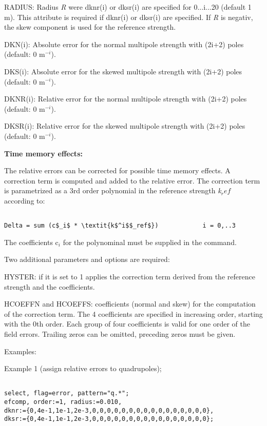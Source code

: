 RADIUS: Radius \textit{R} were dknr(i) or dksr(i) are specified for 0...i...20 (default 1 m). This attribute is required if dknr(i) or dksr(i) are specified. If \textit{R} is negativ, the skew component is used for the reference strength. 

DKN(i): Absolute error for the normal multipole strength with (2i+2) poles (default: 0  m$^{-i}$). 

DKS(i): Absolute error for the skewed multipole strength with (2i+2) poles (default: 0  m$^{-i}$). 

DKNR(i): Relative error for the normal multipole strength with (2i+2) poles (default: 0  m$^{-i}$). 

DKSR(i): Relative error for the skewed multipole strength with (2i+2) poles (default: 0  m$^{-i}$). 


\textbf{Time memory effects:}

 The relative errors can be corrected for possible time memory effects. A correction term is computed and added to the relative error. 
 The correction term is parametrized as a 3rd order polynomial in the  reference strength \textit{k$_ref$} according to: 


\begin{verbatim}

Delta = sum (c$_i$ * \textit{k$^i$$_ref$})            i = 0,..3
\end{verbatim}
 The coefficients c$_i$ for the polynominal must be supplied in the command. 

 Two additional parameters and options are required: 


HYSTER: if it is set to 1 applies the correction term derived from the reference strength and the coefficients. 


HCOEFFN and HCOEFFS: coefficients (normal and skew) for the computation of the correction term. The 4 coefficients are specified in increasing order, starting with the 0th order. Each group of four coefficients is valid for one order of the field errors. Trailing zeros can be omitted, preceding zeros must be given. 


 Examples: 


 Example 1 (assign relative errors to quadrupoles); 
\begin{verbatim}

select, flag=error, pattern="q.*";
efcomp, order:=1, radius:=0.010,
dknr:={0,4e-1,1e-1,2e-3,0,0,0,0,0,0,0,0,0,0,0,0,0,0,0,0},
dksr:={0,4e-1,1e-1,2e-3,0,0,0,0,0,0,0,0,0,0,0,0,0,0,0,0};
\end{verbatim}

